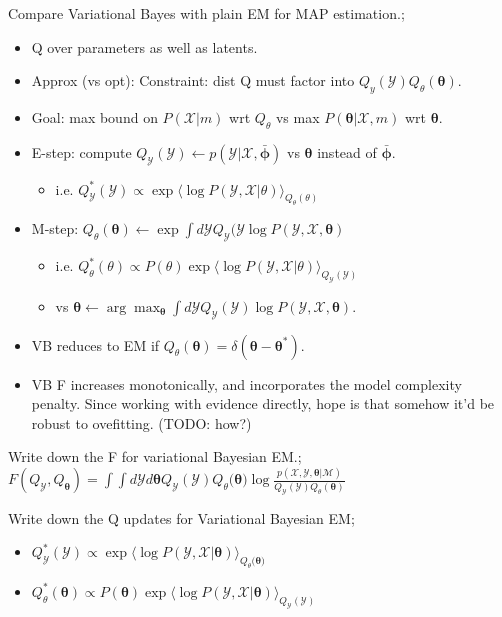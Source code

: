 \documentclass{article}
\begin{document}
Compare Variational Bayes with plain EM for MAP estimation.; \begin{itemize} \item Q over parameters as well as latents.  \item Approx (vs opt): Constraint: dist Q must factor into $Q_y(\mathcal{Y})Q_\theta(\bm{\theta})$.  \item Goal: max bound on $P(\mathcal{X}|m)$ wrt $Q_\theta$ vs max $P(\bm{\theta}|\mathcal{X},m)$ wrt $\bm{\theta}$.  \item E-step: compute $Q_{\mathcal{Y}}(\mathcal{Y})\leftarrow p(\mathcal{Y}|\mathcal{X},\bm{\bar{\phi}})$ vs $\bm{\theta}$ instead of $\bar{\bm{\phi}}$.\begin{itemize} \item i.e. $Q^*_\mathcal{Y}(\mathcal{Y}) \propto \exp \langle \log P(\mathcal{Y,X}|\theta)\rangle_{Q_\theta(\theta)}$ \end{itemize} \item M-step: $Q_\theta(\bm{\theta}) \leftarrow \exp \int d\mathcal{Y}Q_\mathcal{Y}(\mathcal{Y}\log P(\mathcal{Y, X}, \bm{\theta})$ \begin{itemize} \item i.e. $Q^*_\theta(\theta) \propto P(\theta)\exp \langle \log P(\mathcal{Y,X}|\theta)\rangle_{Q_\mathcal{Y}(\mathcal{Y})}$\item vs $\bm{\theta} \leftarrow \arg\max_{\bm{\theta}}\int d\mathcal{Y}Q_{\mathcal{Y}}(\mathcal{Y})\log P(\mathcal{Y, X}, \bm{\theta})$.  \end{itemize} \item VB reduces to EM if $Q_{\theta}(\bm{\theta})=\delta(\bm{\theta-\theta^*})$.  \item VB F increases monotonically, and incorporates the model complexity penalty. Since working with evidence directly, hope is that somehow it'd be robust to ovefitting. (TODO: how?) \end{itemize} 

Write down the F for variational Bayesian EM.; $F(Q_\mathcal{Y}, Q_{\bm{\theta}}) = \int \int d\mathcal{Y}d\bm{\theta}Q_{\mathcal{Y}}(\mathcal{Y})Q_\theta(\bm{\theta)}\log\frac{p(\mathcal{X, Y}, \bm{\theta}|\mathcal{M})}{Q_{\mathcal{Y}}(\mathcal{Y})Q_\theta(\bm{\theta})}$

Write down the Q updates for Variational Bayesian EM; \begin{itemize} \item $Q^*_{\mathcal{Y}}(\mathcal{Y})\propto \exp \langle \log P(\mathcal{Y, X}|\bm{\theta})\rangle_{Q_\theta(\bm{\theta)}}$ \item $Q^*_{\theta}(\bm{\theta})\propto P(\bm{\theta})\exp \langle \log P(\mathcal{Y, X}|\bm{\theta})\rangle_{Q_\mathcal{Y}(\mathcal{Y})}$ \end{itemize}
\end{document}

